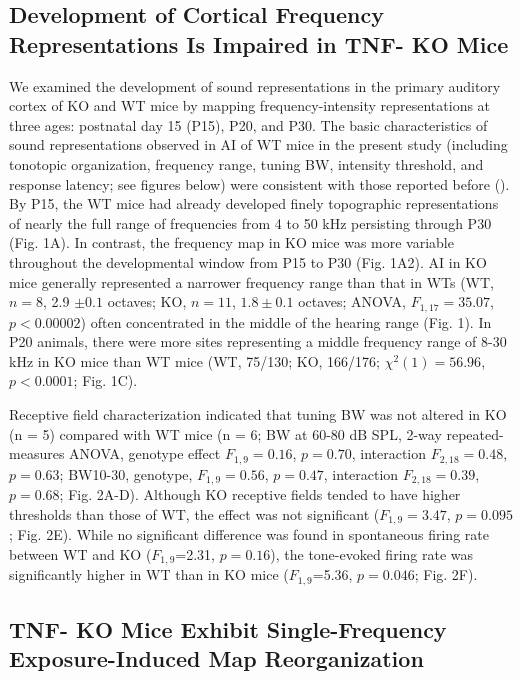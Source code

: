 \subsection{Development of Cortical Frequency Representations Is Impaired in TNF-\textalpha{}  KO Mice}

We examined the development of sound representations in the primary auditory cortex of KO and WT mice by mapping frequency-intensity representations at three ages: postnatal day 15 (P15), P20, and P30. The basic characteristics of sound representations observed in AI of WT mice in the present study (including tonotopic organization, frequency range, tuning BW, intensity threshold, and response latency; see figures below) were consistent with those reported before (\cite{Guo2012}). By P15, the WT mice had already developed finely topographic representations of nearly the full range of frequencies from 4 to 50 kHz persisting through P30 (Fig. 1A). In contrast, the frequency map in KO mice was more variable throughout the developmental window from P15 to P30 (Fig. 1A2). AI in KO mice generally represented a narrower frequency range than that in WTs (WT, $n = 8$, 2.9 $\pm0.1$ octaves; KO, $n = 11$, $1.8\pm0.1$ octaves; ANOVA, $F_{1,17}=35.07$, $p<0.00002$) often concentrated in the middle of the hearing range (Fig. 1). In P20 animals, there were more sites representing a middle frequency range of 8-30 kHz in KO mice than WT mice (WT, 75/130; KO, 166/176; $\chi^2(1)=56.96$, $p<0.0001$; Fig. 1C).

Receptive field characterization indicated that tuning BW was not altered in KO (n = 5) compared with WT mice (n = 6; BW at 60-80 dB SPL, 2-way repeated-measures ANOVA, genotype effect $F_{1,9}=0.16$, $p=0.70$, interaction $F_{2,18}=0.48$, $p=0.63$; BW10-30, genotype, $F_{1,9}=0.56$, $p=0.47$, interaction $F_{2,18}=0.39$, $p=0.68$; Fig. 2A-D). Although KO receptive fields tended to have higher thresholds than those of WT, the effect was not significant ($F_{1,9}=3.47$, $p=0.095$; Fig. 2E). While no significant difference was found in spontaneous firing rate between WT and KO ($F_{1,9}$=2.31, $p=0.16$), the tone-evoked firing rate was significantly higher in WT than in KO mice ($F_{1,9}$=5.36, $p=0.046$; Fig. 2F).

\subsection{TNF-\textalpha{} KO Mice Exhibit Single-Frequency Exposure-Induced Map Reorganization}

